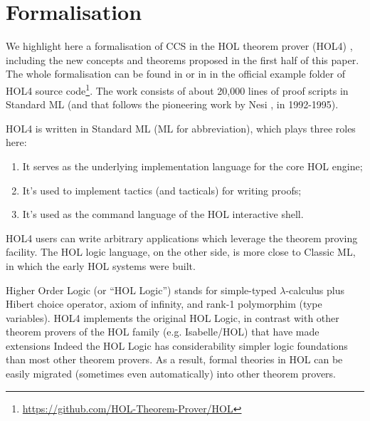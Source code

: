 \section{Formalisation}
\label{s:for}
We highlight here a formalisation of CCS
in the HOL theorem
prover (HOL4) \cite{slind2008brief},
including the new concepts and theorems proposed in the first half of
this paper.
The whole formalisation can be found 
in \cite{Tian:2017wrba}  or in 
 in the official example folder of HOL4 source
code\footnote{\url{https://github.com/HOL-Theorem-Prover/HOL}}. The
work consists of about 20,000 lines of proof scripts in Standard ML
(and that follows the pioneering work by Nesi \cite{Nesi:1992ve}, in
1992-1995). 

HOL4 is written in Standard ML (ML for abbreviation), which plays three roles here:
\begin{enumerate}
\item It serves as the underlying implementation language for the core HOL engine;
\item It's used to implement tactics (and tacticals) for writing proofs;
\item It's used as the command language of the HOL interactive shell.
\end{enumerate}
HOL4 users can write arbitrary applications which leverage
the theorem proving facility. 
\iflong
The HOL logic language, on the other
 side, is more close to Classic ML, in which the early HOL systems were built.
\fi

Higher Order Logic (or ``HOL Logic'') \cite{hollogic} stands for simple-typed $\lambda$-calculus plus Hibert
choice operator, axiom of infinity, and rank-1 polymorphim (type
variables). HOL4 implements the original HOL Logic, 
in contrast with 
 other theorem provers of the HOL family (e.g. Isabelle/HOL) that have
made extensions
Indeed the HOL Logic has considerability simpler logic
foundations than most other theorem provers. %
As a result,
formal theories in HOL can be easily migrated (sometimes even
automatically) into other theorem provers.


